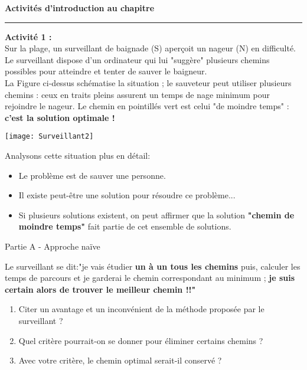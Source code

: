 \documentclass[12pt,french]{article}
\begin{document}
\chead{}
\renewcommand{\headrulewidth}{0.5pt}
\lfoot{                      }
\pagestyle{fancy}
\renewcommand{\footrulewidth}{0.4pt}
\begin{center}
	\Large{\textbf{Activités d'introduction au chapitre}}
\end{center} 
\hrule
\medskip
\large{\textbf{Activité 1 :}}\\
\normalsize
Sur la plage, un surveillant  de baignade (S) aperçoit un nageur (N) en difficulté. Le surveillant dispose d'un ordinateur qui lui "suggère" plusieurs chemins possibles pour atteindre et tenter de sauver le baigneur. \\
La Figure ci-dessus schématise la situation ; le sauveteur peut utiliser plusieurs chemins : ceux en traits pleins assurent un temps de nage minimum pour rejoindre le nageur. Le chemin en pointillés vert est celui "de moindre temps" : \textbf{c'est la solution optimale !}\\
\begin{minipage}{0.6\linewidth}
\begin{center}
	\texttt{[image: Surveillant2]}
\end{center}
\end{minipage}
\begin{minipage}{0.4\linewidth}
Analysons cette situation plus en détail:
\begin{itemize}
	\item Le problème est de sauver une personne.
	\item Il existe peut-être une solution pour résoudre ce problème...
	\item Si plusieurs solutions existent, on peut affirmer que la solution \textbf{"chemin de moindre temps"} fait partie de cet ensemble de solutions.
\end{itemize}
\end{minipage}
\begin{center}
	Partie A - Approche naïve
\end{center}
Le surveillant se dit:"je vais étudier  \textbf{un à un tous les chemins} puis, calculer les temps de parcours et je garderai le chemin correspondant au minimum ;  \textbf{je suis certain alors de trouver le meilleur chemin !!"}
\vspace{2mm}
\begin{enumerate}
	\item Citer un avantage et un inconvénient de la méthode proposée par le surveillant ?
	\item Quel critère pourrait-on se donner pour éliminer certains chemins ?
	\item Avec votre critère, le chemin optimal serait-il conservé ?
\end{enumerate}
\end{document}
